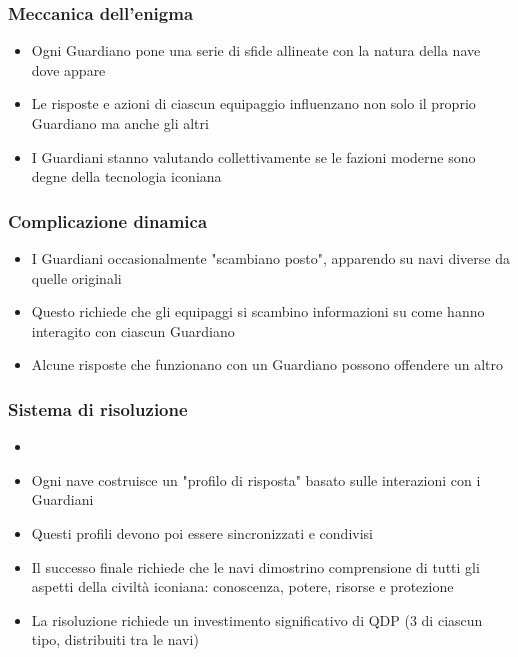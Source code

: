 \documentclass[letterpaper,twocolumn,openany,nodeprecatedcode]{dndbook}
\begin{document}
\subsubsection{Meccanica dell'enigma}

\begin{itemize}
    \item Ogni Guardiano pone una serie di sfide allineate con la natura della nave dove appare
    \item Le risposte e azioni di ciascun equipaggio influenzano non solo il proprio Guardiano ma anche gli altri
    \item I Guardiani stanno valutando collettivamente se le fazioni moderne sono degne della tecnologia iconiana
\end{itemize}

\subsubsection{Complicazione dinamica}

\begin{itemize}
    \item I Guardiani occasionalmente "scambiano posto", apparendo su navi diverse da quelle originali
    \item Questo richiede che gli equipaggi si scambino informazioni su come hanno interagito con ciascun Guardiano
    \item Alcune risposte che funzionano con un Guardiano possono offendere un altro
\end{itemize}

\subsubsection{Sistema di risoluzione}
\begin{itemize}
    \item 
    \item Ogni nave costruisce un "profilo di risposta" basato sulle interazioni con i Guardiani
    \item Questi profili devono poi essere sincronizzati e condivisi
    \item Il successo finale richiede che le navi dimostrino comprensione di tutti gli aspetti della civiltà iconiana: conoscenza, potere, risorse e protezione
    \item La risoluzione richiede un investimento significativo di QDP (3 di ciascun tipo, distribuiti tra le navi)
\end{itemize}
\end{document}
